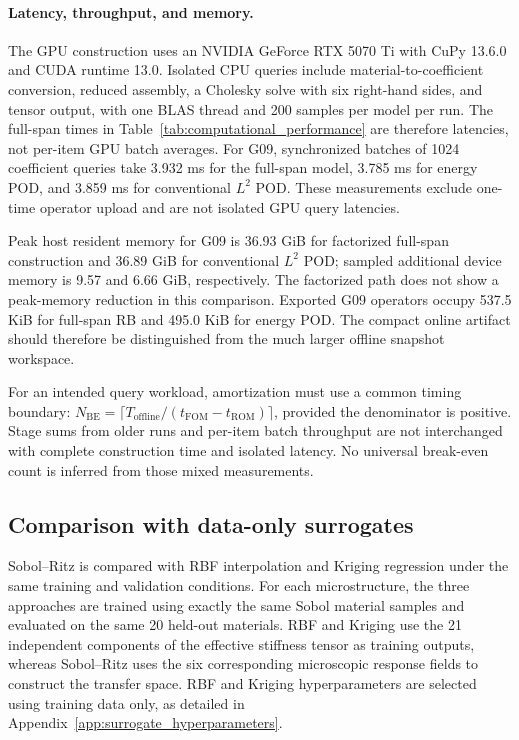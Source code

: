 \documentclass[pdflatex,sn-basic,Numbered]{sn-jnl}
\begin{document}
\paragraph{Latency, throughput, and memory.}
The GPU construction uses an NVIDIA GeForce RTX 5070 Ti with CuPy 13.6.0 and
CUDA runtime 13.0. Isolated CPU queries include material-to-coefficient
conversion, reduced assembly, a Cholesky solve with six right-hand sides,
and tensor output, with one BLAS thread and 200 samples per model per run.
The full-span times in Table~\ref{tab:computational_performance} are therefore
latencies, not per-item GPU batch averages. For G09, synchronized batches of
1024 coefficient queries take 3.932 ms for the full-span model, 3.785 ms for
energy POD, and 3.859 ms for conventional \(L^2\) POD. These measurements
exclude one-time operator upload and are not isolated GPU query latencies.

Peak host resident memory for G09 is 36.93 GiB for factorized full-span
construction and 36.89 GiB for conventional \(L^2\) POD; sampled additional
device memory is 9.57 and 6.66 GiB, respectively. The factorized path does not
show a peak-memory reduction in this comparison. Exported G09 operators
occupy 537.5 KiB for full-span RB and 495.0 KiB for energy POD. The compact
online artifact should therefore be distinguished from the much larger
offline snapshot workspace.

For an intended query workload, amortization must use a common timing
boundary: \(N_{\mathrm{BE}}=\lceil T_{\mathrm{offline}}/
(t_{\mathrm{FOM}}-t_{\mathrm{ROM}})\rceil\), provided the denominator is
positive. Stage sums from older runs and per-item batch throughput are not
interchanged with complete construction time and isolated latency. No
universal break-even count is inferred from those mixed measurements.

\subsection{Comparison with data-only surrogates}
\label{subsec:surrogate_comparison}

Sobol--Ritz is compared with RBF interpolation and Kriging regression under
the same training and validation conditions. For each microstructure, the
three approaches are trained using exactly the same Sobol material samples and
evaluated on the same 20 held-out materials. RBF and Kriging use the 21
independent components of the effective stiffness tensor as training outputs,
whereas Sobol--Ritz uses the six corresponding microscopic response fields to
construct the transfer space. RBF and Kriging hyperparameters are selected
using training data only, as detailed in
Appendix~\ref{app:surrogate_hyperparameters}.
\end{document}

